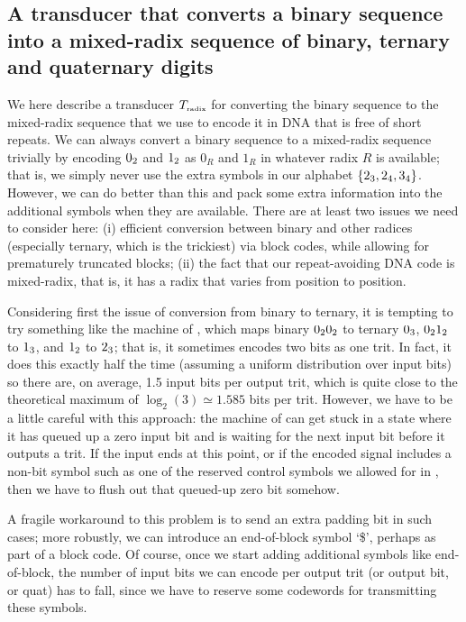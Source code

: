 \documentclass[english]{article}
\begin{document}
\subsection{A transducer that converts a binary sequence into a mixed-radix sequence of binary, ternary and quaternary digits}

We here describe a transducer $T_{\mbox{\tiny radix}}$ for converting the binary sequence to the mixed-radix sequence
that we use to encode it in DNA that is free of short repeats.
We can always convert a binary sequence to a mixed-radix sequence trivially by encoding
$0_2$ and $1_2$ as $0_R$ and $1_R$ in whatever radix $R$ is available;
that is, we simply never use the extra symbols in our alphabet $\{ 2_3, 2_4, 3_4 \}$.
However, we can do better than this and pack some extra information into the additional symbols when they are available.
There are at least two issues we need to consider here: (i) efficient conversion between binary and other radices
(especially ternary, which is the trickiest) via block codes, while allowing for prematurely truncated blocks;
(ii) the fact that our repeat-avoiding DNA code is mixed-radix, that is, it has a radix that varies from position to position.

Considering first the issue of conversion from binary to ternary,
it is tempting to try something like the machine of ,
which maps binary $0_20_2$ to ternary $0_3$,
$0_21_2$ to $1_3$,
and $1_2$ to $2_3$;
that is, it sometimes encodes two bits as one trit.
In fact, it does this exactly half the time (assuming a uniform distribution over input bits)
so there are, on average, 1.5 input bits per output trit,
which is quite close to the theoretical maximum of $\log_2(3) \simeq 1.585$ bits per trit.
However, we have to be a little careful with this approach:
the machine of  can get stuck in a state where it has queued up a zero input bit
and is waiting for the next input bit before it outputs a trit.
If the input ends at this point, or if the encoded signal includes a non-bit symbol
such as one of the reserved control symbols we allowed for in ,
then we have to flush out that queued-up zero bit somehow.

A fragile workaround to this problem is to send an extra padding bit in such cases;
more robustly, we can introduce an end-of-block symbol `\$',
perhaps as part of a block code.
Of course, once we start adding additional symbols like end-of-block, the number of input bits we can encode per output trit (or output bit, or quat) has to fall,
since we have to reserve some codewords for transmitting these symbols.
\end{document}
